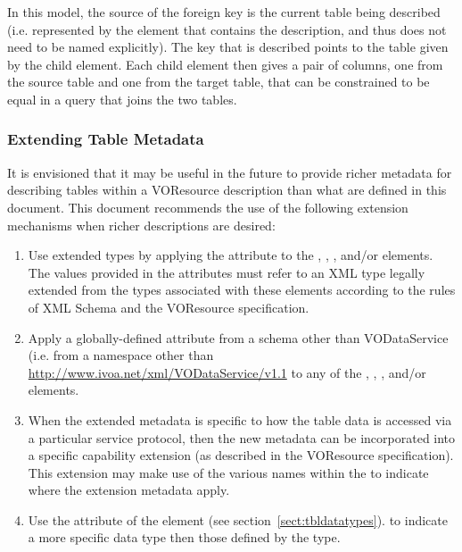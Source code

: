 \documentclass[11pt,a4paper]{ivoa}
\begin{document}


In this model, the source of the foreign
key is the current table being described (i.e. represented by the
 element that contains the
 description, and thus does not need to be
named explicitly).  The key that is described points to the table
given by the  child element.  Each child
 element then gives a pair of columns, one
from the source table and one from the target table, that can be
constrained to be equal in a query that joins the two tables.  






\subsubsection{Extending Table Metadata}
\label{sect:tblext}

It is envisioned that it may be useful in the future to provide richer
metadata for describing tables within a VOResource description than
what are defined in this document.  This document recommends the
use of the following extension mechanisms when richer descriptions are
desired:

\begin{enumerate}
\item Use extended types by applying the 
       attribute to the ,
       , , 
        and/or
        elements.  The values provided in the
       attributes must refer to an XML type legally extended from the types
       associated with these elements according to the rules of XML Schema
       \citep{std:XSD} and the VOResource specification.

\item Apply a globally-defined attribute from a schema other than
       VODataService (i.e. from a namespace other than
       \url{http://www.ivoa.net/xml/VODataService/v1.1} to any of the
       , ,
       , and/or 
       elements.

\item When the extended metadata is specific to how the table data is
       accessed via a particular service protocol, then the new
       metadata can be incorporated into a specific capability
       extension (as described in the VOResource specification).  
       This extension may make use of the
       various names within the  to
       indicate where the extension metadata apply.

\item Use the  attribute of the
        element (see 
       section~\ref{sect:tbldatatypes}).
       to indicate a more specific data type then those defined by the
        type.
\end{enumerate}
\end{document}
